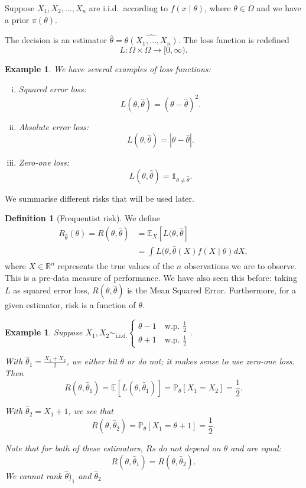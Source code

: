 \documentclass{tufte-handout}
\newcommand*\R{\mathbb{R}}
\newcommand*\E{\mathbb{E}}
\renewcommand{\P}{\mathbb{P}}
\newtheorem{ex}[thm]{Example}
\theoremstyle{definition}
\newtheorem{defn}[thm]{Definition}
\begin{document}

Suppose $X_1,X_2,\ldots,X_n$ are i.i.d.\ according to $f(x\mid \theta)$, where $\theta \in \Omega$ and we have a prior $\pi(\theta)$.

The decision is an estimator $\hat{\theta} = \hat{\theta(X_1,\ldots,X_n)}$.
The loss function is redefined \[
	L: \Omega \times \Omega \to [0,\infty)
.\] 
\begin{ex}
	We have several examples of loss functions:
	\begin{enumerate}[(i)]
		\item Squared error loss: \[
			L(\theta, \hat{\theta}) = (\theta-\hat{\theta})^2 
		.\] 
		\item Absolute error loss: \[
			L(\theta, \hat{\theta}) = \left| \theta - \hat{\theta} \right|
		.\] 
		\item {}Zero-one loss: \[
				L(\theta, \hat{\theta}) = \mathds{1}_{\theta \ne \hat{\theta}}
		.\] 
	\end{enumerate}
\end{ex}

We summarise different risks that will be used later.
\begin{defn}[Frequentist risk]
	We define
	\begin{align*}
		R_{\hat{\theta}}(\theta) = R(\theta, \hat{\theta}) &= \E_{X}\left[L(\theta, \hat{\theta}\right] \\
														   &= \int_{}^{} L(\theta, \hat{\theta}(X) f(X \mid \theta) dX
	,\end{align*} where $X \in \R^n$ represents the true values of the $n$ observations we are to observe. This is a pre-data measure of performance. We have also seen this before: taking $L$ as squared error loss, $R(\theta, \hat{\theta})$ is the Mean Squared Error. Furthermore, for a given estimator, risk is a function of $\theta$.
\end{defn}

\begin{ex}
	Suppose $X_1,X_2 \sim_{\text{i.i.d.}} \begin{cases}
		\theta - 1\quad \text{w.p. }\frac{1}{2}\\
		\theta + 1\quad \text{w.p. } \frac{1}{2}
	\end{cases}.$

	With $\hat{\theta}_1 = \frac{X_1+X_2}{2}$, we either hit $\theta$ or do not; it makes sense to use zero-one loss. Then \[
		R(\theta, \hat{\theta}_1) = \E\left[L(\theta, \hat{\theta}_1)\right] = \P_\theta\left[X_1 = X_2\right] = \frac{1}{2}
	.\] 

	With $\hat{\theta}_2 = X_1 + 1$, we see that \[
		R(\theta, \hat{\theta}_2) = \P_\theta\left[X_1 = \theta+1\right] = \frac{1}{2}
	.\] 

	Note that for both of these estimators, $R$s do not depend on $\theta$ and are equal: \[
		R(\theta, \hat{\theta}_1) = R(\theta, \hat{\theta}_2)
	.\] We cannot rank $\hat{\theta})_1$ and $\hat{\theta}_2$
\end{ex}
\end{document}
